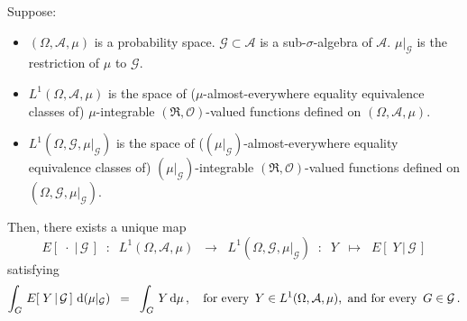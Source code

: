 \begin{theorem}
\label{Thm:ExistenceConditionalExpectation}
\mbox{}\vskip 0.2cm
\noindent
Suppose:
\begin{itemize}
\item
	$(\Omega,\mathcal{A},\mu)$ is a probability space.
	$\mathcal{G} \subset \mathcal{A}$ is a sub-$\sigma$-algebra of $\mathcal{A}$.
	$\mu\vert_{\mathcal{G}}$ is the restriction of $\mu$ to $\mathcal{G}$.
\item
	$L^{1}(\Omega,\mathcal{A},\mu)$ is the space of
	($\mu$-almost-everywhere equality equivalence classes of)
	$\mu$-integrable $(\Re,\mathcal{O})$-valued functions
	defined on $(\Omega,\mathcal{A},\mu)$.
\item
	$L^{1}(\Omega,\mathcal{G},\mu\vert_{\mathcal{G}})$ is the space of
	($(\mu\vert_{\mathcal{G}})$-almost-everywhere equality equivalence classes of)	
	$(\mu\vert_{\mathcal{G}})$-integrable $(\Re,\mathcal{O})$-valued functions
	defined on $(\Omega,\mathcal{G},\mu\vert_{\mathcal{G}})$.
\end{itemize}
Then, there exists a unique map
\begin{equation*}
E\!\left[\;\cdot\;\vert\,\mathcal{G}\,\right]
\;\; : \;\; L^{1}(\Omega,\mathcal{A},\mu)
\;\;\longrightarrow\;\; L^{1}(\Omega,\mathcal{G},\mu\vert_{\mathcal{G}})
\;\; : \;\; Y \;\; \longmapsto \;\; E\!\left[\;Y\,\vert\,\mathcal{G}\,\right]
\end{equation*}
satisfying
\begin{equation*}
\int_{G}\, E\!\left[\;Y\,\vert\,\mathcal{G}\,\right] \,\textnormal{d}(\mu\vert_{\mathcal{G}})
\;\; = \;\;
\int_{G}\, Y \,\textnormal{d}\mu\,,
\quad
\textnormal{for every \,$Y \in L^{1}(\Omega,\mathcal{A},\mu)$,\, and for every \,$G \in \mathcal{G}$}\,.
\end{equation*}

\end{theorem}
